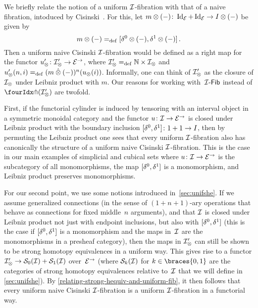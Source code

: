 \documentclass[reqno,10pt,a4paper,oneside,draft]{amsart}
\begin{document}
\begin{remark} \label{cisinski-remark}
We briefly relate the notion of a uniform $\cal{I}$-fibration with that of a naive fibration, intoduced by Cisinski~\cite{cisinski-asterisque}.
For this, let $m \otimes (-)  \co \Id_\catE + \Id_\catE \to \interval \otimes (-)$ be given by
\[
  m \otimes (-) \defeq [\lcyl \otimes (-), \rcyl \otimes (-)] \, .
\]
Then a uniform naive Cisinski $\cal{I}$-fibration would be defined as a right map for the functor $u_\otimes' \co \cal{I}_\otimes' \to \catE^\to$, where $\cal{I}_\otimes' \defeq \mathbb{N} \times \cal{I}_\otimes$ and $u_\otimes'(n, i) \defeq (m \hatotimes (-))^n(u_\otimes(i))$.
Informally, one can think of
$\cal{I}_\otimes'$ as the closure of $\cal{I}_\otimes$ under Leibniz product with $m$.
Our reasons for working with~$\Fib{\cal{I}}$ instead of $\liftr{(\cal{I}_\otimes')}$ are twofold.

First, if the functorial cylinder is induced by tensoring with an interval object in a symmetric monoidal category and the functor $u \co \cal{I} \to \catE^\to$ is closed under Leibniz product with the boundary inclusion $[\lcyl, \rcyl] \co 1 + 1 \to \interval$, then by permuting the Leibniz product one sees that every uniform $\cal{I}$-fibration also has canonically the structure of a uniform naive Cisinski $\cal{I}$-fibration.
This is the case in our main examples of simplicial and cubical sets where $u \co \cal{I} \to \catE^\to$ is the subcategory of all monomorphisms, the map $[\lcyl, \rcyl]$ is a monomorphism, and Leibniz product preserves monomorphisms.

For our second point, we use some notions introduced in~\cref{sec:unifshe}.
If we assume generalized connections (in the sense of $(1+n+1)$-ary operations that behave as connections for fixed middle~$n$ arguments), and that $\cal{I}$ is closed under Leibniz product not just with endpoint inclusions, but also with $[\lcyl, \rcyl]$ (this is the case if $[\lcyl, \rcyl]$ is a monomorphism and the maps in~$\cal{I}$ are the monomorphisms in a presheaf category), then the maps in $\cal{I}_\otimes'$ can still be shown to be strong homotopy equivalences in a uniform way.
This gives rise to a functor $\cal{I}_\otimes' \to \cal{S}_0(\cal{I}) + \cal{S}_1(\cal{I})$ over~$\catE^\to$ (where $\cal{S}_k(\cal{I})$ for $k \in \braces{0, 1}$ are the categories of strong homotopy equivalences relative to~$\cal{I}$ that we will define in \cref{sec:unifshe}).
By \cref{relating-strong-hequiv-and-uniform-fib}, it then follows that every uniform naive Cisinski $\cal{I}$-fibration is a uniform $\cal{I}$-fibration in a functorial way.
\end{remark}
\end{document}
